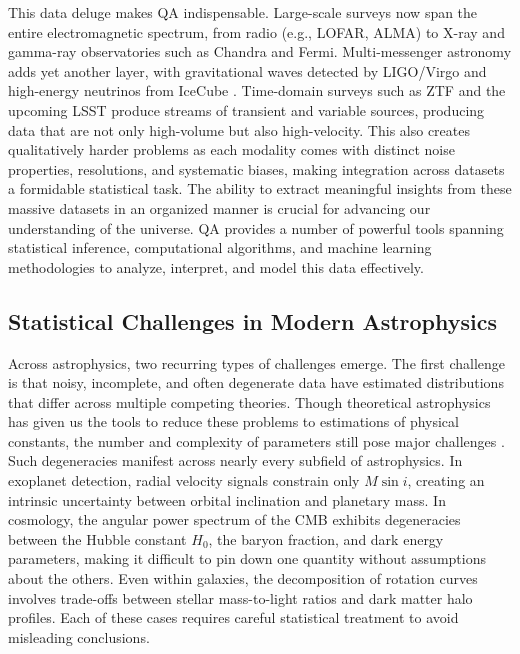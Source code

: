 \documentclass[preprint,longauthor]{aastex631}
\begin{document}
This data deluge makes QA indispensable. Large-scale surveys now span the entire electromagnetic spectrum, from radio (e.g., LOFAR, ALMA) to X-ray and gamma-ray observatories such as Chandra and Fermi. Multi-messenger astronomy adds yet another layer, with gravitational waves detected by LIGO/Virgo and high-energy neutrinos from IceCube \citep{abbasiSearchIceCubeSubTeV2023}. Time-domain surveys such as ZTF and the upcoming LSST produce streams of transient and variable sources, producing data that are not only high-volume but also high-velocity. This also creates qualitatively harder problems as each modality comes with distinct noise properties, resolutions, and systematic biases, making integration across datasets a formidable statistical task. The ability to extract meaningful insights from these massive datasets in an organized manner is crucial for advancing our understanding of the universe. QA provides a number of powerful tools spanning statistical inference, computational algorithms, and machine learning methodologies to analyze, interpret, and model this data effectively.

\subsection{Statistical Challenges in Modern Astrophysics}

Across astrophysics, two recurring types of challenges emerge. The first challenge is that noisy, incomplete, and often degenerate data have estimated distributions that differ across multiple competing theories. Though theoretical astrophysics has given us the tools to reduce these problems to estimations of physical constants, the number and complexity of parameters still pose major challenges \citep{schaferFrameworkStatisticalInference2015}. Such degeneracies manifest across nearly every subfield of astrophysics. In exoplanet detection, radial velocity signals constrain only $M \sin i$, creating an intrinsic uncertainty between orbital inclination and planetary mass. In cosmology, the angular power spectrum of the CMB exhibits degeneracies between the Hubble constant $H_{0}$, the baryon fraction, and dark energy parameters, making it difficult to pin down one quantity without assumptions about the others. Even within galaxies, the decomposition of rotation curves involves trade-offs between stellar mass-to-light ratios and dark matter halo profiles. Each of these cases requires careful statistical treatment to avoid misleading conclusions.
\end{document}
